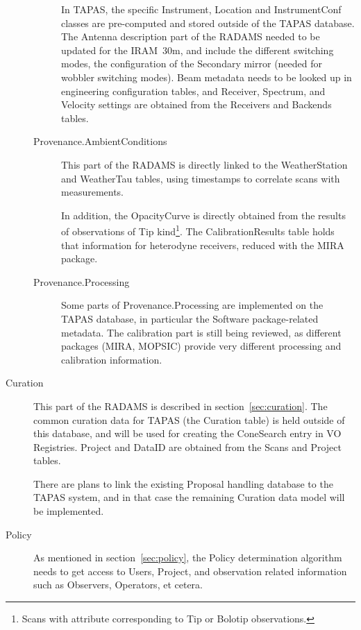 \begin{description}
\begin{description}
					In TAPAS, the specific Instrument, Location
					and Instrument\-Conf classes are pre-computed
					and stored outside of the TAPAS database.
					The Antenna description part of the RADAMS
					needed to be updated for the IRAM~30m, and
					include the different switching modes, the
					configuration of the Secondary mirror (needed
					for wobbler switching modes). Beam metadata
					needs to be looked up in engineering
					configuration tables, and Receiver,
					Spectrum, and Velocity settings are obtained
					from the Receivers and Backends tables.
					
					
					\item[Provenance.AmbientConditions] This
					part of the RADAMS is directly linked to
					the WeatherStation and WeatherTau tables,
					using timestamps to correlate scans with
					measurements.
					
					In addition, the OpacityCurve is directly
					obtained from the results of observations
					of Tip kind\footnote{Scans with
					 attribute
					corresponding to Tip or Bolotip observations.}.
					The CalibrationResults table holds that
					information for heterodyne receivers, reduced
					with the MIRA package.
					
					
					\item[Provenance.Processing] Some parts of
					Provenance.Processing are implemented on the
					TAPAS database, in particular the Software
					package-related metadata. The calibration
					part is still being reviewed, as different
					packages (MIRA, MOPSIC) provide very
					different processing and calibration
					information. 
					
					
				\end{description}

				\item[Curation] This part of the RADAMS is described
				in section~\ref{sec:curation}. The common curation
				data for TAPAS (the Curation table) is held outside
				of this database, and will be used for creating the
				ConeSearch entry in VO Registries. Project and
				DataID are obtained from the Scans and Project
				tables.
				
				There are plans to link the existing Proposal
				handling database to  the TAPAS system, and in that
				case the remaining Curation data model will be
				implemented.

				\item[Policy] As mentioned in
				section~\ref{sec:policy}, the Policy determination
				algorithm needs to get access to Users, Project,
				and observation related information such as
				Observers, Operators, et cetera.
				

\end{description}
